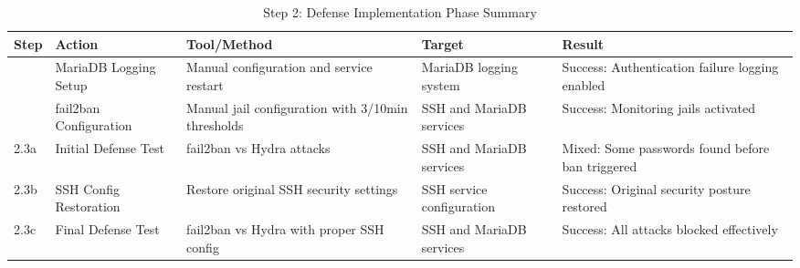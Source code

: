 \begin{table}[h!]
\centering
\begin{tabularx}{\textwidth}{|>{\raggedright\arraybackslash}X|>{\raggedright\arraybackslash}X|>{\raggedright\arraybackslash}X|>{\raggedright\arraybackslash}X|>{\raggedright\arraybackslash}X|}
\hline
\textbf{Step} & \textbf{Action} & \textbf{Tool/Method} & \textbf{Target} & \textbf{Result} \\
\hline
2.1 & MariaDB Logging Setup & Manual configuration and service restart & MariaDB logging system & \cellcolor{green!20}Success: Authentication failure logging enabled \\
\hline
2.2 & fail2ban Configuration & Manual jail configuration with 3/10min thresholds & SSH and MariaDB services & \cellcolor{green!20}Success: Monitoring jails activated \\
\hline
2.3a & Initial Defense Test & fail2ban vs Hydra attacks & SSH and MariaDB services & \cellcolor{yellow!20}Mixed: Some passwords found before ban triggered \\
\hline
2.3b & SSH Config Restoration & Restore original SSH security settings & SSH service configuration & \cellcolor{green!20}Success: Original security posture restored \\
\hline
2.3c & Final Defense Test & fail2ban vs Hydra with proper SSH config & SSH and MariaDB services & \cellcolor{green!20}Success: All attacks blocked effectively \\
\hline
\end{tabularx}
\caption{Step 2: Defense Implementation Phase Summary}
\label{tab:step2-summary}
\end{table}